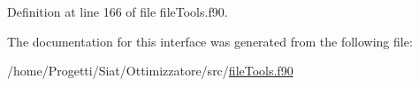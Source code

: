 Definition at line 166 of file file\-Tools.\-f90.



The documentation for this interface was generated from the following file\-:\begin{DoxyCompactItemize}
\item 
/home/\-Progetti/\-Siat/\-Ottimizzatore/src/\hyperlink{file_tools_8f90}{file\-Tools.\-f90}\end{DoxyCompactItemize}
